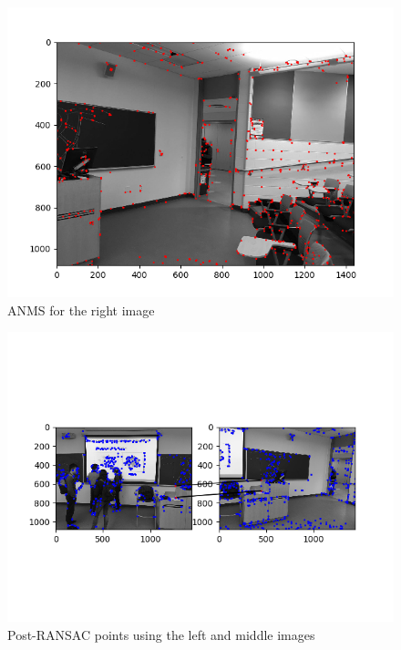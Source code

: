 \documentclass[10pt]{article}
\begin{document}
    	\begin{figure}[h]
		\caption{ANMS for the right image}
		\centering
		\includegraphics{anmsR.png}
	\end{figure}
        
	\begin{figure}[h]
		\caption{Post-RANSAC points using the left and middle images}
		\centering
		\includegraphics{postranLM.png}
	\end{figure}
	
\end{document}
